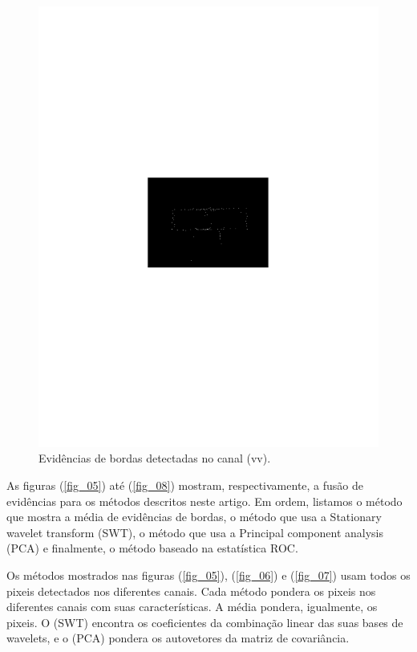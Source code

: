 \documentclass[conference]{IEEEtran}
\begin{document}
\begin{figure}[hbt]
	\includegraphics[scale=0.75]{flevoland_vv_evid_crop.pdf}
	\vspace{-6.0cm}
	\caption{Evidências de bordas detectadas no canal (vv).}
\label{fig_04}
\end{figure}

As figuras (\ref{fig_05}) até (\ref{fig_08}) mostram, respectivamente, a fusão de evidências para os métodos descritos neste artigo. Em ordem, listamos o método que mostra a média de evidências de bordas, o método que usa a Stationary wavelet transform (SWT), o método que usa a Principal component analysis (PCA) e finalmente, o método baseado na estatística ROC.

Os métodos mostrados nas figuras (\ref{fig_05}), (\ref{fig_06}) e (\ref{fig_07}) usam todos os pixeis detectados nos diferentes canais. Cada método pondera os pixeis nos diferentes canais com suas características. A média pondera, igualmente, os pixeis. O (SWT) encontra os coeficientes da combinação linear das suas bases de wavelets, e o (PCA) pondera os autovetores da matriz de covariância.
\end{document}
